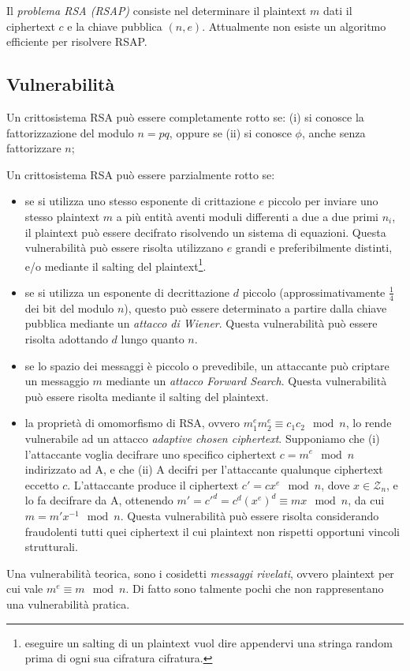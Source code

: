 Il \textit{problema RSA (RSAP)} consiste nel determinare il plaintext $m$ dati il ciphertext $c$ e la chiave pubblica $(n,e)$. Attualmente non esiste un algoritmo efficiente per risolvere RSAP.

\subsection{Vulnerabilità}
Un crittosistema RSA può essere completamente rotto se:
(i) si conosce la fattorizzazione del modulo $n=pq$, oppure se
(ii) si conosce $\phi$, anche senza fattorizzare $n$;

Un crittosistema RSA può essere parzialmente rotto se:
\begin{itemize}
  \item se si utilizza uno stesso esponente di crittazione $e$ piccolo per inviare uno stesso plaintext $m$ a più entità aventi moduli differenti a due a due primi $n_{i}$, il plaintext può essere decifrato risolvendo un sistema di equazioni. Questa vulnerabilità può essere risolta utilizzano $e$ grandi e preferibilmente distinti, e/o mediante il salting del plaintext\footnote{eseguire un salting di un plaintext vuol dire appendervi una stringa random prima di ogni sua cifratura cifratura.}.

  \item se si utilizza un esponente di decrittazione $d$ piccolo (approssimativamente $\frac{1}{4}$ dei bit del modulo $n$), questo può essere determinato a partire dalla chiave pubblica mediante un \textit{attacco di Wiener}. Questa vulnerabilità può essere risolta adottando $d$ lungo quanto $n$.

  \item se lo spazio dei messaggi è piccolo o prevedibile, un attaccante può criptare un messaggio $m$ mediante un \textit{attacco Forward Search}. Questa vulnerabilità può essere risolta mediante il salting del plaintext.

  \item la proprietà di omomorfismo di RSA, ovvero $m_{1}^{e}m_{2}^{e} \equiv c_{1}c_{2} \mod n$, lo rende vulnerabile ad un attacco \textit{adaptive chosen ciphertext}.
  Supponiamo che (i) l'attaccante voglia decifrare uno specifico ciphertext $c=m^{e} \mod n$ indirizzato ad A, e che (ii) A decifri per l'attaccante qualunque ciphertext eccetto $c$. L'attaccante produce il ciphertext $c'=cx^{e} \mod n$, dove $x\in\mathcal{Z}_{n}$, e lo fa decifrare da A, ottenendo $m'=c'^{d}=c^{d}(x^{e})^{d}\equiv mx \mod n$, da cui $m=m'x^{-1} \mod n$.
  Questa vulnerabilità può essere risolta considerando fraudolenti tutti quei ciphertext il cui plaintext non rispetti opportuni vincoli strutturali.
\end{itemize}

Una vulnerabilità teorica, sono i cosidetti \textit{messaggi rivelati}, ovvero plaintext per cui vale $m^{e} \equiv m \mod n$. Di fatto sono talmente pochi che non rappresentano una vulnerabilità pratica.
